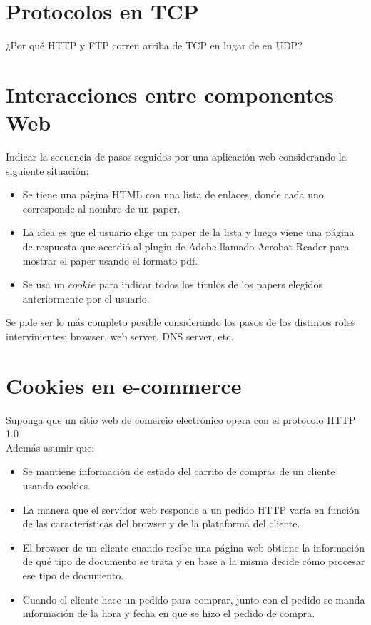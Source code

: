 \documentclass[12pt]{report}
\begin{document}

\section{Protocolos en TCP \sone \steo}

¿Por qué HTTP y FTP corren arriba de TCP en lugar de en UDP?

\section{Interacciones entre componentes Web \stwo}

Indicar la secuencia de pasos seguidos por una aplicación web considerando la
siguiente situación:

\begin{itemize}
	\item Se tiene una página HTML con una lista de enlaces, donde cada uno corresponde al nombre de un paper.
	\item La idea es que el usuario elige un paper de la lista y luego viene una página de respuesta que accedió al plugin de Adobe llamado Acrobat Reader para mostrar el paper usando el formato pdf.
	\item Se usa un $cookie$ para indicar todos los títulos de los papers elegidos anteriormente por el usuario.
\end{itemize}

Se pide ser lo más completo posible considerando los pasos de los distintos roles intervinientes: browser, web server, DNS server, etc.


\section{Cookies en e-commerce \sthree}

Suponga que un sitio web de comercio electrónico opera con el protocolo HTTP 1.0\\Además asumir que:

\begin{itemize}
	\item Se mantiene información de estado del carrito de compras de un cliente usando
	      cookies.
	\item La manera que el servidor web responde a un pedido HTTP varía en función de las
	      características del browser y de la plataforma del cliente.
	\item El browser de un cliente cuando recibe una página web obtiene la información de qué
	      tipo de documento se trata y en base a la misma decide cómo procesar ese tipo de documento.
	\item Cuando el cliente hace un pedido para comprar, junto con el pedido se manda
	      información de la hora y fecha en que se hizo el pedido de compra.
\end{itemize}
\end{document}
